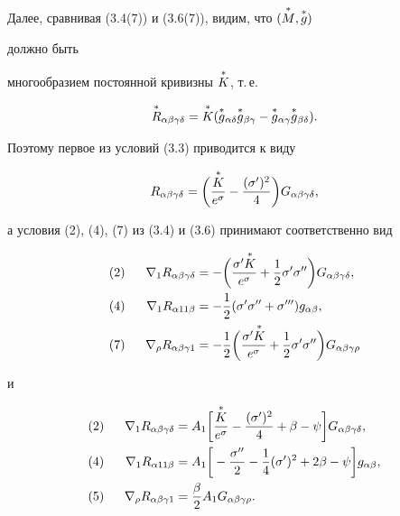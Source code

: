 Далее, сравнивая (3.4(7)) и (3.6(7)), видим, что $(\overset{*}{M}{},\overset{*}{g}{})$ 


должно быть 


многообразием постоянной кривизны $\overset{*}{K}{}$, т.\,е. 


$$ 


\up{R}_{\alpha\beta\gamma\delta}=\up{K} 


(\up{g}_{\alpha\delta}\up{g}_{\beta\gamma}- 


\up{g}_{\alpha\gamma}\up{g}_{\beta\delta}). 


$$ 


Поэтому первое из условий (3.3) приводится к виду 


\begin{equation} 


R_{\alpha\beta\gamma\delta}=\bigg( 


\frac{\up{K}}{e^\sigma}-\frac{(\sigma')^2}{4}\bigg) 


G_{\alpha\beta\gamma\delta}, 


\end{equation} 


а условия (2), (4), (7) из (3.4) и (3.6) принимают соответственно вид 


\begin{alignat}{2}


(2&) &\ \; \nabla_1 R_{\alpha\beta\gamma\delta}&= 


-\bigg(\frac{\sigma'\up{K}}{e^\sigma}+\frac{1}{2}\sigma'\sigma'' 


\bigg)G_{\alpha\beta\gamma\delta},\notag\\ 


(4&) &\ \; \nabla_1 R_{\alpha 11\beta}&=-\frac{1}{2} 


(\sigma'\sigma''+\sigma''')g_{\alpha\beta},\\ 


(7&) &\ \; \nabla_\rho R_{\alpha\beta\gamma 1}&= 


-\frac{1}{2}\bigg(\frac{\sigma'\up{K}}{e^\sigma}+ 


\frac{1}{2}\sigma'\sigma''\bigg) 


G_{\alpha\beta\gamma\rho}\notag


\end{alignat} 


и 


\begin{alignat}{2}


(2&) &\ \; \nabla_1 R_{\alpha\beta\gamma\delta}&=A_1 


\bigg[\frac{\up{K}}{e^\sigma}-\frac{(\sigma')^2}{4} 


+\beta-\psi\bigg]G_{\alpha\beta\gamma\delta},\notag\\ 


(4&) &\ \; \nabla_1 R_{\alpha 11\beta}&=A_1 


\bigg[-\frac{\sigma''}{2}-\frac{1}{4}(\sigma')^2 


+2\beta-\psi\bigg]g_{\alpha\beta},\\ 


(5&) &\ \; \nabla_\rho R_{\alpha\beta\gamma 1}&=\frac{\beta}{2} 


A_1 G_{\alpha\beta\gamma\rho}.\notag


\end{alignat} 


